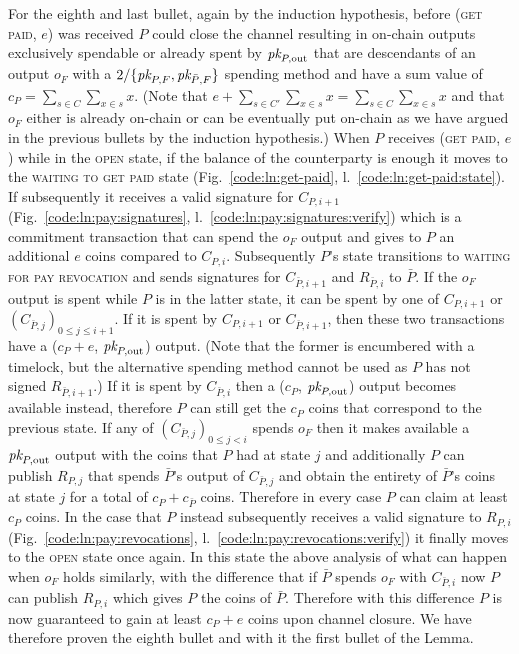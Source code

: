   For the eighth and last bullet, again by the induction hypothesis, before
  (\textsc{get paid}, $e$) was received $P$ could close the channel resulting in
  on-chain outputs exclusively spendable or already spent by $\textit{pk}_{P,
  \mathrm{out}}$ that are descendants of an output $o_F$ with a $2/\{\textit{pk}_{P, F},
  \textit{pk}_{\bar{P}, F}\}$ spending method and have a sum value of $c_P =
  \sum\limits_{s \in C} \sum\limits_{x \in s} x$. (Note that $e + \sum\limits_{s
  \in C'} \sum\limits_{x \in s} x = \sum\limits_{s \in C} \sum\limits_{x \in s}
  x$ and that $o_F$ either is already on-chain or can be eventually put on-chain
  as we have argued in the previous bullets by the induction hypothesis.) When
  $P$ receives (\textsc{get paid}, $e$) while in the \textsc{open} state, if the
  balance of the counterparty is enough it moves to the \textsc{waiting to get
  paid} state (Fig.~\ref{code:ln:get-paid}, l.~\ref{code:ln:get-paid:state}). If
  subsequently it receives a valid signature for $C_{P, i+1}$
  (Fig.~\ref{code:ln:pay:signatures}, l.~\ref{code:ln:pay:signatures:verify})
  which is a commitment transaction that can spend the $o_F$ output and gives to
  $P$ an additional $e$ coins compared to $C_{P, i}$. Subsequently $P$'s state
  transitions to \textsc{waiting for pay revocation} and sends signatures for
  $C_{\bar{P}, i+1}$ and $R_{\bar{P}, i}$ to $\bar{P}$. If the $o_F$ output is
  spent while $P$ is in the latter state, it can be spent by one of $C_{P, i+1}$
  or $(C_{\bar{P}, j})_{0 \leq j \leq i+1}$. If it is spent by $C_{P, i+1}$ or
  $C_{\bar{P}, i+1}$, then these two transactions have a ($c_P + e$, $\textit{pk}_{P,
  \mathrm{out}}$) output. (Note that the former is encumbered with a timelock,
  but the alternative spending method cannot be used as $P$ has not signed
  $R_{\bar{P}, i+1}$.) If it is spent by $C_{\bar{P}, i}$ then a ($c_P$, $\textit{pk}_{P,
  \mathrm{out}}$) output becomes available instead, therefore $P$ can still get
  the $c_P$ coins that correspond to the previous state. If any of $(C_{\bar{P},
  j})_{0 \leq j < i}$ spends $o_F$ then it makes available a $\textit{pk}_{P,
  \mathrm{out}}$ output with the coins that $P$ had at state $j$ and
  additionally $P$ can publish $R_{P, j}$ that spends $\bar{P}$'s output of
  $C_{\bar{P}, j}$ and obtain the entirety of $\bar{P}$'s coins at state $j$ for
  a total of $c_P + c_{\bar{P}}$ coins.  Therefore in every case $P$ can claim
  at least $c_P$ coins. In the case that $P$ instead subsequently receives a
  valid signature to $R_{P, i}$ (Fig.~\ref{code:ln:pay:revocations},
  l.~\ref{code:ln:pay:revocations:verify}) it finally moves to the \textsc{open}
  state once again. In this state the above analysis of what can happen when
  $o_F$ holds similarly, with the difference that if $\bar{P}$ spends $o_F$ with
  $C_{\bar{P}, i}$ now $P$ can publish $R_{P, i}$ which gives $P$ the coins of
  $\bar{P}$. Therefore with this difference $P$ is now guaranteed to gain at
  least $c_P + e$ coins upon channel closure. We have therefore proven the
  eighth bullet and with it the first bullet of the Lemma.

